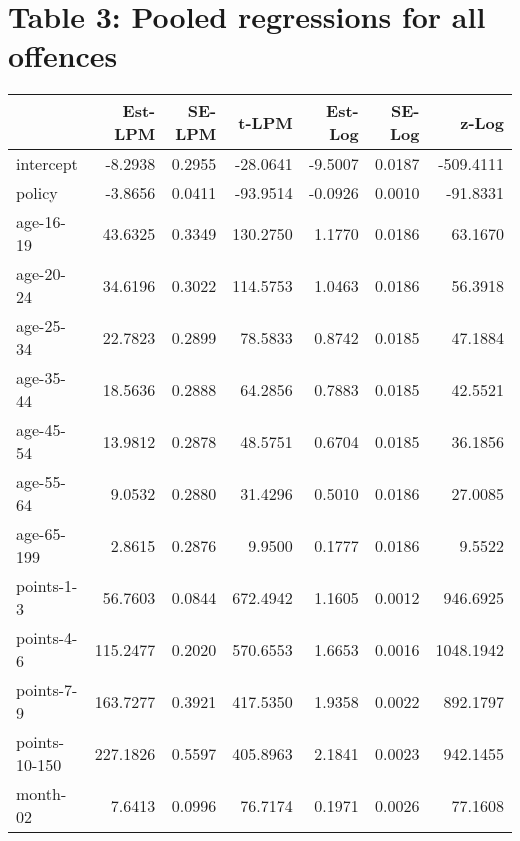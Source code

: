 \documentclass[10pt]{article}
\begin{document}






\section{Table 3: Pooled regressions for all offences}




\begin{table}[ht]
\centering
\begin{tabular}{lrrrrrr}
  \hline
 & Est-LPM & SE-LPM & t-LPM & Est-Log & SE-Log & z-Log \\ 
  \hline
intercept & -8.2938 & 0.2955 & -28.0641 & -9.5007 & 0.0187 & -509.4111 \\ 
  policy & -3.8656 & 0.0411 & -93.9514 & -0.0926 & 0.0010 & -91.8331 \\ 
  age-16-19 & 43.6325 & 0.3349 & 130.2750 & 1.1770 & 0.0186 & 63.1670 \\ 
  age-20-24 & 34.6196 & 0.3022 & 114.5753 & 1.0463 & 0.0186 & 56.3918 \\ 
  age-25-34 & 22.7823 & 0.2899 & 78.5833 & 0.8742 & 0.0185 & 47.1884 \\ 
  age-35-44 & 18.5636 & 0.2888 & 64.2856 & 0.7883 & 0.0185 & 42.5521 \\ 
  age-45-54 & 13.9812 & 0.2878 & 48.5751 & 0.6704 & 0.0185 & 36.1856 \\ 
  age-55-64 & 9.0532 & 0.2880 & 31.4296 & 0.5010 & 0.0186 & 27.0085 \\ 
  age-65-199 & 2.8615 & 0.2876 & 9.9500 & 0.1777 & 0.0186 & 9.5522 \\ 
  points-1-3 & 56.7603 & 0.0844 & 672.4942 & 1.1605 & 0.0012 & 946.6925 \\ 
  points-4-6 & 115.2477 & 0.2020 & 570.6553 & 1.6653 & 0.0016 & 1048.1942 \\ 
  points-7-9 & 163.7277 & 0.3921 & 417.5350 & 1.9358 & 0.0022 & 892.1797 \\ 
  points-10-150 & 227.1826 & 0.5597 & 405.8963 & 2.1841 & 0.0023 & 942.1455 \\ 
  month-02 & 7.6413 & 0.0996 & 76.7174 & 0.1971 & 0.0026 & 77.1608 \\ 

\end{tabular}
\end{table}
\end{document}
